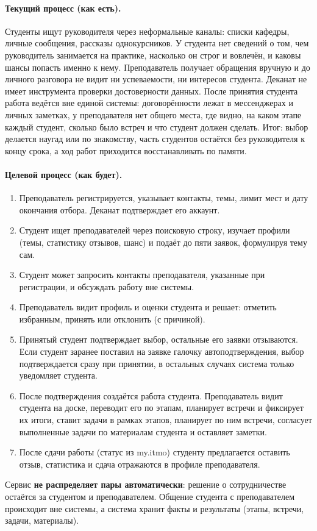 \documentclass[a4paper,12pt]{article}
\begin{document}
\paragraph{Текущий процесс (как есть).}
Студенты ищут руководителя через неформальные каналы: списки кафедры, личные сообщения, рассказы однокурсников. У студента нет сведений о том, чем руководитель занимается на практике, насколько он строг и вовлечён, и каковы шансы попасть именно к нему. Преподаватель получает обращения вручную и до личного разговора не видит ни успеваемости, ни интересов студента. Деканат не имеет инструмента проверки достоверности данных. После принятия студента работа ведётся вне единой системы: договорённости лежат в мессенджерах и личных заметках, у преподавателя нет общего места, где видно, на каком этапе каждый студент, сколько было встреч и что студент должен сделать. Итог: выбор делается наугад или по знакомству, часть студентов остаётся без руководителя к концу срока, а ход работ приходится восстанавливать по памяти.

\paragraph{Целевой процесс (как будет).}
\begin{enumerate}
  \item Преподаватель регистрируется, указывает контакты, темы, лимит мест и дату окончания отбора. Деканат подтверждает его аккаунт.
  \item Студент ищет преподавателей через поисковую строку, изучает профили (темы, статистику отзывов, шанс) и подаёт до пяти заявок, формулируя тему сам.
  \item Студент может запросить контакты преподавателя, указанные при регистрации, и обсуждать работу вне системы.
  \item Преподаватель видит профиль и оценки студента и решает: отметить избранным, принять или отклонить (с причиной).
  \item Принятый студент подтверждает выбор, остальные его заявки отзываются. Если студент заранее поставил на заявке галочку автоподтверждения, выбор подтверждается сразу при принятии, в остальных случаях система только уведомляет студента.
  \item После подтверждения создаётся работа студента. Преподаватель видит студента на доске, переводит его по этапам, планирует встречи и фиксирует их итоги, ставит задачи в рамках этапов, планирует по ним встречи, согласует выполненные задачи по материалам студента и оставляет заметки.
  \item После сдачи работы (статус из my.itmo) студенту предлагается оставить отзыв, статистика и сдача отражаются в профиле преподавателя.
\end{enumerate}
Сервис \textbf{не распределяет пары автоматически}: решение о сотрудничестве остаётся за студентом и преподавателем. Общение студента с преподавателем происходит вне системы, а система хранит факты и результаты (этапы, встречи, задачи, материалы).
\end{document}
